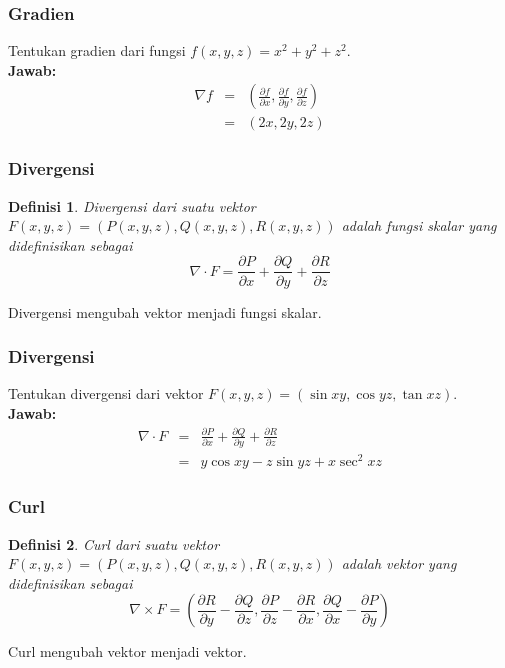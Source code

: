 \documentclass[10pt]{beamer}
\newtheorem{definisi}{Definisi}
\begin{document}
\begin{frame}
    \frametitle{Gradien}
    \begin{example}
        Tentukan gradien dari fungsi $f(x,y,z) = x^2 + y^2 + z^2$.\\
        \textbf{Jawab:}
        \begin{eqnarray*}
            \nabla f &=& \left(\frac{\partial f}{\partial x}, \frac{\partial f}{\partial y}, \frac{\partial f}{\partial z}\right)\\
            &=& \left(2x, 2y, 2z\right)
        \end{eqnarray*}
    \end{example}
\end{frame}

\begin{frame}
    \frametitle{Divergensi}
    \begin{definisi}
        Divergensi dari suatu vektor $F(x,y,z) = (P(x,y,z), Q(x,y,z), R(x,y,z))$ adalah fungsi skalar yang didefinisikan sebagai
        \begin{equation}
            \nabla \cdot F = \frac{\partial P}{\partial x} + \frac{\partial Q}{\partial y} + \frac{\partial R}{\partial z}
        \end{equation}
    \end{definisi}
    Divergensi mengubah vektor menjadi fungsi skalar.
\end{frame}

\begin{frame}
    \frametitle{Divergensi}
    \begin{example}
        Tentukan divergensi dari vektor $F(x,y,z) = (\sin xy, \cos yz, \tan xz)$.\\
        \textbf{Jawab:}
        \begin{eqnarray*}
            \nabla \cdot F &=& \frac{\partial P}{\partial x} + \frac{\partial Q}{\partial y} + \frac{\partial R}{\partial z}\\
            &=& y\cos xy - z \sin yz + x\sec^2 xz
        \end{eqnarray*}
    \end{example}
\end{frame}

\begin{frame}
    \frametitle{Curl}
    \begin{definisi}
        Curl dari suatu vektor $F(x,y,z) = (P(x,y,z), Q(x,y,z), R(x,y,z))$ adalah vektor yang didefinisikan sebagai
        \begin{equation}
            \nabla \times F = \left(\frac{\partial R}{\partial y} - \frac{\partial Q}{\partial z}, \frac{\partial P}{\partial z} - \frac{\partial R}{\partial x}, \frac{\partial Q}{\partial x} - \frac{\partial P}{\partial y}\right)
        \end{equation}
    \end{definisi}
    Curl mengubah vektor menjadi vektor.
\end{frame}
\end{document}

